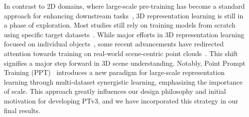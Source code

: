 In contrast to 2D domains, where large-scale pre-training has become a standard approach for enhancing downstream tasks~\cite{caron2021emerging}, 3D representation learning is still in a phase of exploration. Most studies still rely on training models from scratch using specific target datasets~\cite{xie2020pointcontrast}. While major efforts in 3D representation learning focused on individual objects~\cite{wang2019deep,sauder2019self,sanghi2020info3d, Pang2022pointmae, Yu2022pointbert}, some recent advancements have redirected attention towards training on real-world scene-centric point clouds~\cite{xie2020pointcontrast,hou2021exploring,wu2023masked, jiang2023msp, zhu2023ponderv2}. This shift signifies a major step forward in 3D scene understanding. Notably, Point Prompt Training (PPT)~\cite{wu2023ppt} introduces a new paradigm for large-scale representation learning through multi-dataset synergistic learning, emphasizing the importance of scale. This approach greatly influences our design philosophy and initial motivation for developing PTv3, and we have incorporated this strategy in our final results.
